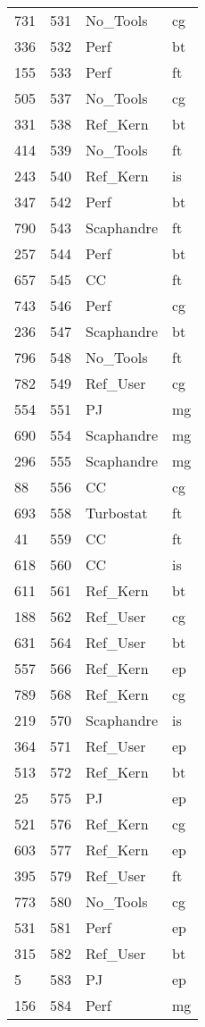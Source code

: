 \begin{tabular}{lrll}
731 & 531 & No_Tools & cg \\
336 & 532 & Perf & bt \\
155 & 533 & Perf & ft \\
505 & 537 & No_Tools & cg \\
331 & 538 & Ref_Kern & bt \\
414 & 539 & No_Tools & ft \\
243 & 540 & Ref_Kern & is \\
347 & 542 & Perf & bt \\
790 & 543 & Scaphandre & ft \\
257 & 544 & Perf & bt \\
657 & 545 & CC & ft \\
743 & 546 & Perf & cg \\
236 & 547 & Scaphandre & bt \\
796 & 548 & No_Tools & ft \\
782 & 549 & Ref_User & cg \\
554 & 551 & PJ & mg \\
690 & 554 & Scaphandre & mg \\
296 & 555 & Scaphandre & mg \\
88 & 556 & CC & cg \\
693 & 558 & Turbostat & ft \\
41 & 559 & CC & ft \\
618 & 560 & CC & is \\
611 & 561 & Ref_Kern & bt \\
188 & 562 & Ref_User & cg \\
631 & 564 & Ref_User & bt \\
557 & 566 & Ref_Kern & ep \\
789 & 568 & Ref_Kern & cg \\
219 & 570 & Scaphandre & is \\
364 & 571 & Ref_User & ep \\
513 & 572 & Ref_Kern & bt \\
25 & 575 & PJ & ep \\
521 & 576 & Ref_Kern & cg \\
603 & 577 & Ref_Kern & ep \\
395 & 579 & Ref_User & ft \\
773 & 580 & No_Tools & cg \\
531 & 581 & Perf & ep \\
315 & 582 & Ref_User & bt \\
5 & 583 & PJ & ep \\
156 & 584 & Perf & mg \\

\end{tabular}
